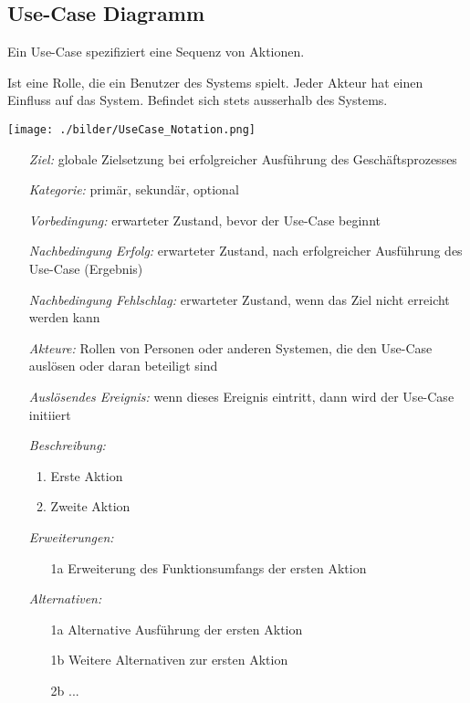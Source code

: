\subsection{Use-Case Diagramm }
	Ein Use-Case spezifiziert eine Sequenz von Aktionen.
	\begin{description}[leftmargin=2.5cm]
		\item[Akteur]
      \parbox{7cm}{
        Ist eine Rolle, die ein Benutzer des Systems spielt. Jeder Akteur hat einen Einfluss auf das System. Befindet sich stets ausserhalb des Systems.}
      \hspace{0.5cm}
      \parbox{6cm}{\texttt{[image: ./bilder/UseCase\_Notation.png]}}
    \item[Schablone \Balzert{68}]
      \begin{itemize}[leftmargin=4.5cm]
        \item[\textit{Ziel:}]
          globale Zielsetzung bei erfolgreicher Ausführung des Geschäftsprozesses
        \item[\textit{Kategorie:}]
          primär, sekundär, optional
        \item[\textit{Vorbedingung:}]
          erwarteter Zustand, bevor der Use-Case beginnt
        \item[\textit{Nachbedingung Erfolg:}]
          erwarteter Zustand, nach erfolgreicher Ausführung des Use-Case (Ergebnis)
        \item[\textit{Nachbedingung Fehlschlag:}]
          erwarteter Zustand, wenn das Ziel nicht erreicht werden kann
        \item[\textit{Akteure:}]
          Rollen von Personen oder anderen Systemen, die den Use-Case auslösen
          oder daran beteiligt sind
        \item[\textit{Auslösendes Ereignis:}]
          wenn dieses Ereignis eintritt, dann wird der Use-Case initiiert
        \item[\textit{Beschreibung:}]
          \begin{enumerate}[leftmargin=0.5cm]
            \item Erste Aktion
            \item Zweite Aktion
          \end{enumerate}
        \item[\textit{Erweiterungen:}]
          \begin{enumerate}[leftmargin=0.5cm]
            \item[1a] Erweiterung des Funktionsumfangs der ersten Aktion
          \end{enumerate}
        \item[\textit{Alternativen:}]
          \begin{enumerate}[leftmargin=0.5cm]
            \item[1a] Alternative Ausführung der ersten Aktion
            \item[1b] Weitere Alternativen zur ersten Aktion
            \item[2b] ...
          \end{enumerate}
      \end{itemize}
	\end{description}

